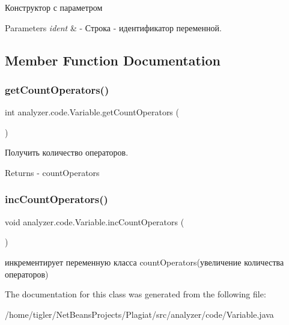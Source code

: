Конструктор с параметром 
\begin{DoxyParams}{Parameters}
{\em ident} & -\/ Строка -\/ идентификатор переменной. \\
\hline
\end{DoxyParams}


\subsection{Member Function Documentation}
\mbox{\label{classanalyzer_1_1code_1_1Variable_a03cf6dacfd545ab3ee82b5109ecd0e14}} 
\subsubsection{\texorpdfstring{get\+Count\+Operators()}{getCountOperators()}}
{\footnotesize\ttfamily int analyzer.\+code.\+Variable.\+get\+Count\+Operators (\begin{DoxyParamCaption}{ }\end{DoxyParamCaption})\hspace{0.3cm}{\ttfamily [inline]}}

Получить количество операторов. \begin{DoxyReturn}{Returns}
-\/ count\+Operators 
\end{DoxyReturn}
\mbox{\label{classanalyzer_1_1code_1_1Variable_a9ff60aa209b91fd406d2f529fd4d721d}} 
\subsubsection{\texorpdfstring{inc\+Count\+Operators()}{incCountOperators()}}
{\footnotesize\ttfamily void analyzer.\+code.\+Variable.\+inc\+Count\+Operators (\begin{DoxyParamCaption}{ }\end{DoxyParamCaption})\hspace{0.3cm}{\ttfamily [inline]}}

инкрементирует переменную класса count\+Operators(увеличение количества операторов) 

The documentation for this class was generated from the following file\+:\begin{DoxyCompactItemize}
\item 
/home/tigler/\+Net\+Beans\+Projects/\+Plagiat/src/analyzer/code/Variable.\+java\end{DoxyCompactItemize}
